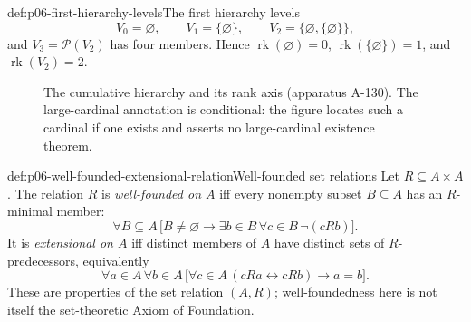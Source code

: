 \begin{hbexample}{def:p06-first-hierarchy-levels}{The first hierarchy levels}
\[
 V_0=\varnothing,
 \qquad
 V_1=\{\varnothing\},
 \qquad
 V_2=\{\varnothing,\{\varnothing\}\},
\]
and \(V_3=\mathcal P(V_2)\) has four members.  Hence
\(\operatorname{rk}(\varnothing)=0\),
\(\operatorname{rk}(\{\varnothing\})=1\), and
\(\operatorname{rk}(V_2)=2\).
\end{hbexample}

\begin{figure}[htbp]
\centering
{}
\caption{The cumulative hierarchy and its rank axis (apparatus A-130).  The
large-cardinal annotation is conditional: the figure locates such a cardinal
if one exists and asserts no large-cardinal existence theorem.}
\label{fig:p06-cumulative-hierarchy}
\end{figure}

\begin{hbdefinition}{def:p06-well-founded-extensional-relation}{Well-founded set relations}
Let \(R\subseteq A\times A\).  The relation \(R\) is \emph{well-founded on
\(A\)} iff every nonempty subset \(B\subseteq A\) has an \(R\)-minimal
member:
\[
 \forall B\subseteq A\,
 \bigl[B\ne\varnothing\to
 \exists b\in B\,\forall c\in B\,\neg(cRb)\bigr].
\]
It is \emph{extensional on \(A\)} iff distinct members of \(A\) have distinct
sets of \(R\)-predecessors, equivalently
\[
 \forall a\in A\,\forall b\in A\,
 \bigl[\forall c\in A\,(cRa\leftrightarrow cRb)\to a=b\bigr].
\]
These are properties of the set relation
\((A,R)\); well-foundedness here is not itself the set-theoretic Axiom of
Foundation.
\end{hbdefinition}

